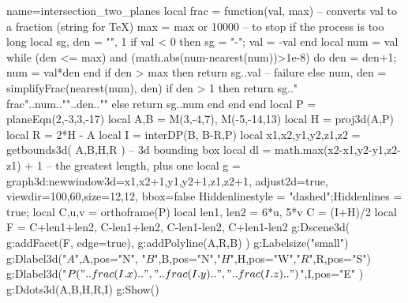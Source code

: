\documentclass[12pt]{standalone}%
\begin{document}
\begin{luadraw}{name=intersection_two_planes}
local frac = function(val, max)  -- converts val to a fraction (string for TeX)
    max = max or 10000 -- to stop if the process is too long
    local sg, den =  "", 1
    if val < 0 then sg = "-"; val = -val end
    local num = val
    while (den <= max) and (math.abs(num-nearest(num))>1e-8) do den = den+1; num = val*den end
    if den > max then 
        return sg..val -- failure
    else
        num, den = simplifyFrac(nearest(num), den)
        if den > 1 then 
            return sg.."\\frac{"..num.."}{"..den.."}"
        else
            return sg..num
        end
    end
end
local P = planeEqn(2,-3,3,-17)
local A,B = M(3,-4,7), M(-5,-14,13)
local H = proj3d(A,P)
local R = 2*H - A
local I = interDP({B, B-R},P)
local x1,x2,y1,y2,z1,z2 = getbounds3d( {A,B,H,R} ) -- 3d bounding box
local dl = math.max(x2-x1,y2-y1,z2-z1) + 1 -- the greatest length, plus one
local g = graph3d:new{window3d={x1,x2+1,y1,y2+1,z1,z2+1}, adjust2d=true, viewdir={100,60},size={12,12}, bbox=false}
Hiddenlinestyle = "dashed";Hiddenlines = true;
local C,u,v = orthoframe(P)
local len1, len2 = 6*u, 5*v
C = (I+H)/2
local F = {C+len1+len2, C-len1+len2, C-len1-len2, C+len1-len2}
g:Dscene3d(
    g:addFacet(F, {edge=true}),
    g:addPolyline({{A,R,B}})
)
g:Labelsize("small")
g:Dlabel3d("$A$",A,{pos="N"}, "$B$",B,{pos="N"},"$H$",H,{pos="W"},"$R$",R,{pos="S"})
g:Dlabel3d("$P("..frac(I.x)..","..frac(I.y)..","..frac(I.z)..")$",I,{pos="E"} )
g:Ddots3d({A,B,H,R,I})
g:Show()
\end{luadraw} 
\end{document}
